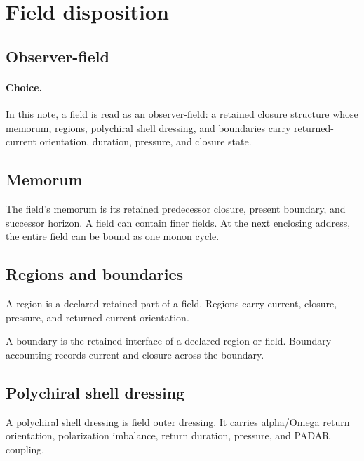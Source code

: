 \section{Field disposition}\label{sec:field-observer-shells}

\subsection{Observer-field}
\paragraph{Choice.}
In this note, a field is read as an observer-field: a retained closure structure whose memorum, regions, polychiral shell dressing, and boundaries carry returned-current orientation, duration, pressure, and closure state.

\subsection{Memorum}
The field's memorum is its retained predecessor closure, present boundary, and successor horizon. A field can contain finer fields. At the next enclosing address, the entire field can be bound as one monon cycle.

\subsection{Regions and boundaries}
\begin{definition}[Region]
A region is a declared retained part of a field. Regions carry current, closure, pressure, and returned-current orientation.
\end{definition}

\begin{definition}[Boundary]
A boundary is the retained interface of a declared region or field. Boundary accounting records current and closure across the boundary.
\end{definition}

\subsection{Polychiral shell dressing}
\begin{definition}
A polychiral shell dressing is field outer dressing. It carries alpha/Omega return orientation, polarization imbalance, return duration, pressure, and PADAR coupling.
\end{definition}

